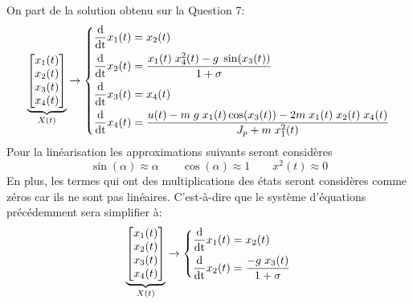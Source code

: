 \documentclass[class=article, crop=false]{standalone}
\begin{document}
\begin{resolution}
    On part de la solution obtenu sur la Question 7:
    \begin{equation*}
        \underbrace{
        \begin{bmatrix}
            x_1(t)\\
            x_2(t)\\
            x_3(t)\\
            x_4(t)\\
        \end{bmatrix}}_{X(t)}
        \to
        \begin{dcases}
            \frac{\text{d}}{\text{dt}} x_1(t) = x_2(t)
            \\
            \frac{\text{d}}{\text{dt}} x_2(t) = \frac{ x_1(t) \; x^2_4(t) - g \; \sin(x_3(t))}{1 + \sigma}
            \\
            \frac{\text{d}}{\text{dt}} x_3(t) = x_4(t)
            \\
            \frac{\text{d}}{\text{dt}} x_4(t) = \frac{u(t) - m \; g \; x_1(t) \cos(x_3(t)) - 2 m \; x_1(t) \; x_2(t) \; x_4(t)}{J_p + m \; x^2_1(t)}
            \\
        \end{dcases}
    \end{equation*}
    Pour la linéarisation les approximations suivants seront considères
    \begin{equation}
        \sin(\alpha) \approx \alpha
        \qquad
        \cos(\alpha) \approx 1
        \qquad
        x^2(t) \approx 0
    \end{equation}
    En plus, les termes qui ont des multiplications des états seront considères comme zéros car ils ne sont pas linéaires. C'est-à-dire que le système d'équations précédemment sera simplifier à:
    \begin{equation*}
        \underbrace{
        \begin{bmatrix}
            x_1(t)\\
            x_2(t)\\
            x_3(t)\\
            x_4(t)\\
        \end{bmatrix}}_{X(t)}
        \to
        \begin{dcases}
            \frac{\text{d}}{\text{dt}} x_1(t) = x_2(t)
            \\
            \frac{\text{d}}{\text{dt}} x_2(t) = \frac{- g \; x_3(t)}{1 + \sigma}
            \\

\end{dcases}
\end{equation*}
\end{resolution}
\end{document}
